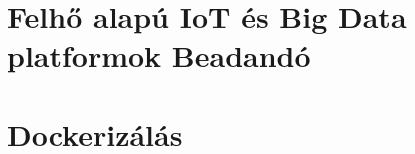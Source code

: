 














\clearpage
\section{Felhő alapú IoT és Big Data platformok Beadandó}


\clearpage
\section{Dockerizálás}






